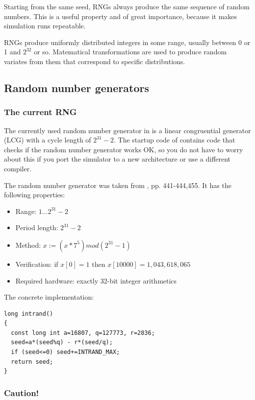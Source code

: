 Starting from the same seed, RNGs always produce the same sequence
of random numbers. This is a useful property and of great importance,
because it makes simulation runs repeatable.

RNGs produce uniformly distributed integers in some range,
usually between 0 or 1 and $2^{32}$ or so. Matematical transformations
are used to produce random variates from them that correspond to
specific distributions.

\subsection{Random number generators}

\subsubsection{The current RNG}

The currently used random number generator in {\opp} is
a linear congruential generator
(LCG) with a cycle length of $2^{31}-2$.
The startup code of {\opp} contains code that checks if the random number
generator works OK, so you do not have to worry about this if you port
the simulator to a new architecture or use a different compiler.

The random number generator was taken from \cite{Jain91}, pp. 441-444,455.
It has the following properties:
\begin{itemize}
   \item{Range: $1... 2^{31}-2$}
   \item{Period length: $2^{31}-2$}
   \item{Method: $x := (x * 7^{5}) mod (2^{31}-1)$}
   \item{Verification: if $x[0] = 1$ then $x[10000] = 1,043,618,065$ }
   \item{Required hardware: exactly 32-bit integer arithmetics}
\end{itemize}

The concrete implementation:

\begin{verbatim}
long intrand()
{
  const long int a=16807, q=127773, r=2836;
  seed=a*(seed%q) - r*(seed/q);
  if (seed<=0) seed+=INTRAND_MAX;
  return seed;
}
\end{verbatim}


\subsubsection{Caution!}

